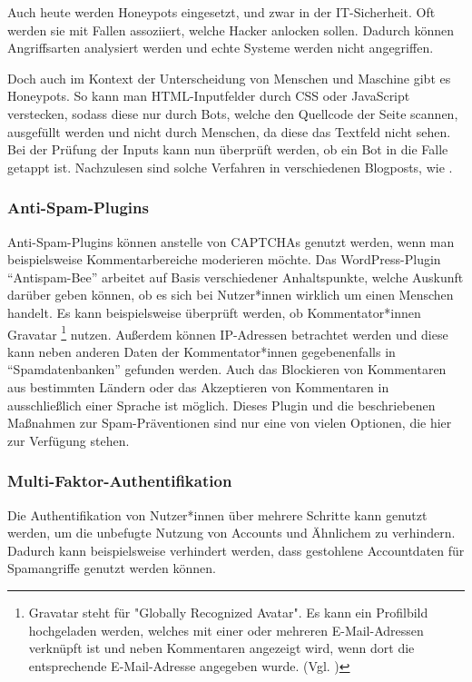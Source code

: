 Auch heute werden Honeypots eingesetzt, und zwar in der IT-Sicherheit. 
Oft werden sie mit Fallen assoziiert, welche Hacker anlocken sollen. 
Dadurch können Angriffsarten analysiert werden und echte Systeme werden nicht angegriffen.

Doch auch im Kontext der Unterscheidung von Menschen und Maschine gibt es Honeypots. 
So kann man HTML-Inputfelder durch CSS oder JavaScript verstecken, sodass diese nur durch Bots, welche den Quellcode der Seite scannen, ausgefüllt werden 
und nicht durch Menschen, da diese das Textfeld nicht sehen. 
Bei der Prüfung der Inputs kann nun überprüft werden, ob ein Bot in die Falle getappt ist. 
Nachzulesen sind solche Verfahren in verschiedenen Blogposts, wie \cite{perry:2019}.

\subsubsection*{Anti-Spam-Plugins}
Anti-Spam-Plugins können anstelle von CAPTCHAs genutzt werden, wenn man beispielsweise Kommentar\-bereiche moderieren möchte.
Das WordPress-Plugin ``Antispam-Bee'' arbeitet auf Basis verschiedener Anhaltspunkte, 
welche Auskunft darüber geben können, ob es sich bei Nutzer*innen wirklich um einen Menschen handelt.
Es kann beispielsweise überprüft werden, ob Kommentator*innen Gravatar
\footnote[3]{Gravatar steht für "Globally Recognized Avatar". 
Es kann ein Profilbild hochgeladen werden, welches mit einer oder mehreren E-Mail-Adressen verknüpft ist 
und neben Kommentaren angezeigt wird, wenn dort die entsprechende E-Mail-Adresse angegeben wurde. (Vgl. \cite{doku:antispambee})} nutzen.
Außerdem können IP-Adressen betrachtet werden und diese kann neben anderen Daten der Kommentator*innen gegebenenfalls in ``Spamdatenbanken'' gefunden werden.
Auch das Blockieren von Kommentaren aus bestimmten Ländern oder das Akzeptieren von Kommentaren in ausschließlich einer Sprache ist möglich.
Dieses Plugin und die beschriebenen Maßnahmen zur Spam-Präventionen sind nur eine von vielen Optionen, die hier zur Verfügung stehen.
\cite{blog:antispambee}
\cite{doku:antispambee}

\subsubsection*{Multi-Faktor-Authentifikation}
Die Authentifikation von Nutzer*innen über mehrere Schritte kann genutzt werden, um die unbefugte Nutzung von Accounts und Ähnlichem zu verhindern.
Dadurch kann beispielsweise verhindert werden, dass gestohlene Accountdaten für Spamangriffe genutzt werden können.


